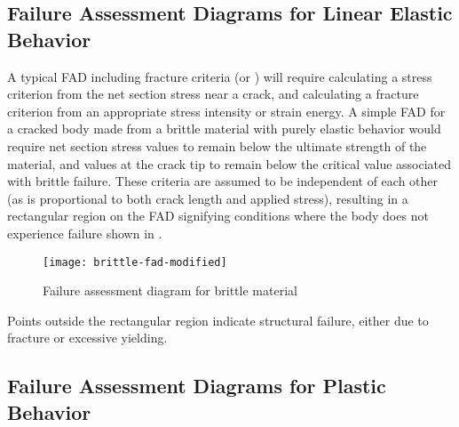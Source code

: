 \subsection{Failure Assessment Diagrams for Linear Elastic Behavior}

A typical FAD including fracture criteria (\K or \J) will require calculating a stress criterion from the net section stress near a crack, and calculating a fracture criterion from an appropriate stress intensity or strain energy.
A simple FAD for a cracked body made from a brittle material with purely elastic behavior would require net section stress values to remain below the ultimate strength of the material, and \K values at the crack tip to remain below the critical \KIc value associated with brittle failure.
These criteria are assumed to be independent of each other (as \K is proportional to both crack length and applied stress), resulting in a rectangular region on the FAD signifying conditions where the body does not experience failure shown in .
\begin{figure}
\centering
\texttt{[image: brittle-fad-modified]}
\caption{\label{fig:brittle-fad} Failure assessment diagram for brittle material}
\end{figure}
Points outside the rectangular region indicate structural failure, either due to fracture or excessive yielding.

\subsection{Failure Assessment Diagrams for Plastic Behavior}

